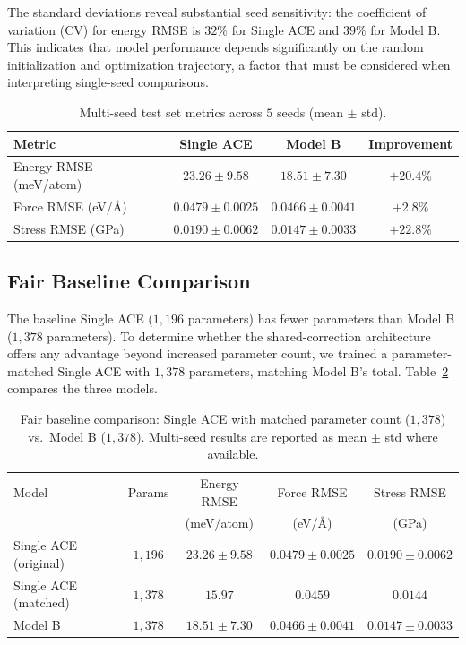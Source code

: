 \documentclass[twoside,prb,aps,floatfix,superscriptaddress,longbibliography]{revtex4-2}
\newcommand{\AAng}{\mbox{\AA}}
\begin{document}
The standard deviations reveal substantial seed sensitivity: the coefficient of variation (CV) for energy RMSE is $32\%$ for Single ACE and $39\%$ for Model B. This indicates that model performance depends significantly on the random initialization and optimization trajectory, a factor that must be considered when interpreting single-seed comparisons.

\begin{table}[t]
\caption{Multi-seed test set metrics across $5$ seeds (mean $\pm$ std).}
\label{tab:multi_seed}
\begin{ruledtabular}
\begin{tabular}{lccc}
\toprule
Metric & Single ACE & Model B & Improvement \\
\midrule
Energy RMSE (meV/atom) & $23.26 \pm 9.58$ & $18.51 \pm 7.30$ & $+20.4\%$ \\
Force RMSE (eV/\AAng) & $0.0479 \pm 0.0025$ & $0.0466 \pm 0.0041$ & $+2.8\%$ \\
Stress RMSE (GPa) & $0.0190 \pm 0.0062$ & $0.0147 \pm 0.0033$ & $+22.8\%$ \\
\bottomrule
\end{tabular}
\end{ruledtabular}
\end{table}

\subsection{Fair Baseline Comparison}
\label{sec:fair_baseline}

The baseline Single ACE ($1{,}196$ parameters) has fewer parameters than Model B ($1{,}378$ parameters). To determine whether the shared-correction architecture offers any advantage beyond increased parameter count, we trained a parameter-matched Single ACE with $1{,}378$ parameters, matching Model B's total. Table~\ref{tab:fair_baseline} compares the three models.

\begin{table}[t]
\caption{Fair baseline comparison: Single ACE with matched parameter count ($1{,}378$) vs.\ Model B ($1{,}378$). Multi-seed results are reported as mean $\pm$ std where available.}
\label{tab:fair_baseline}
\begin{ruledtabular}
\begin{tabular}{lcccc}
\toprule
Model & Params & Energy RMSE & Force RMSE & Stress RMSE \\
 & & (meV/atom) & (eV/\AAng) & (GPa) \\
\midrule
Single ACE (original) & $1{,}196$ & $23.26 \pm 9.58$ & $0.0479 \pm 0.0025$ & $0.0190 \pm 0.0062$ \\
Single ACE (matched) & $1{,}378$ & $15.97$ & $0.0459$ & $0.0144$ \\
Model B & $1{,}378$ & $18.51 \pm 7.30$ & $0.0466 \pm 0.0041$ & $0.0147 \pm 0.0033$ \\
\bottomrule
\end{tabular}
\end{ruledtabular}
\end{table}
\end{document}
